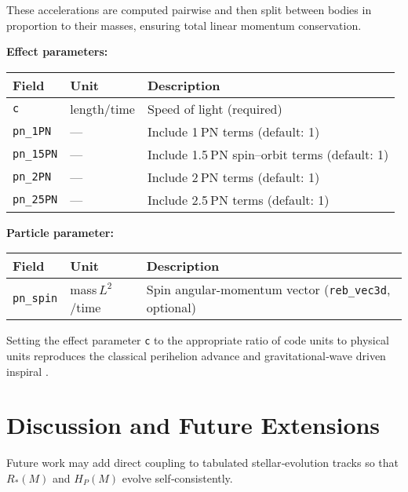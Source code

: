 \documentclass[11pt]{article}
\begin{document}
\medskip
\noindent
These accelerations are computed pairwise and then split between bodies
in proportion to their masses, ensuring total linear momentum conservation.

\bigskip
\noindent\textbf{Effect parameters:}
\begin{table}[h]
\centering\footnotesize
\begin{tabular}{@{}lll@{}}
\toprule
Field            & Unit             & Description                                \\
\midrule
\texttt{c}        & length/time      & Speed of light (required)                  \\
\texttt{pn\_1PN}  & —                & Include 1 PN terms (default: 1)             \\
\texttt{pn\_15PN} & —                & Include 1.5 PN spin–orbit terms (default: 1)\\
\texttt{pn\_2PN}  & —                & Include 2 PN terms (default: 1)             \\
\texttt{pn\_25PN} & —                & Include 2.5 PN terms (default: 1)           \\
\bottomrule
\end{tabular}
\end{table}

\noindent\textbf{Particle parameter:}
\begin{table}[h]
\centering\footnotesize
\begin{tabular}{@{}lll@{}}
\toprule
Field               & Unit               & Description                               \\
\midrule
\texttt{pn\_spin}    & mass\,$L^2$/time   & Spin angular-momentum vector (\texttt{reb\_vec3d}, optional)   \\
\bottomrule
\end{tabular}
\end{table}

Setting the effect parameter \texttt{c} to the appropriate ratio of code
units to physical units reproduces the classical perihelion advance and
gravitational‐wave driven inspiral
\citep{Einstein1915,Peters1964,Kidder1995}.



\section{Discussion and Future Extensions}
\label{sec:future}
Future work may add direct coupling to tabulated stellar‑evolution tracks
so that $R_*(M)$ and $H_P(M)$ evolve self‑consistently.
\end{document}
